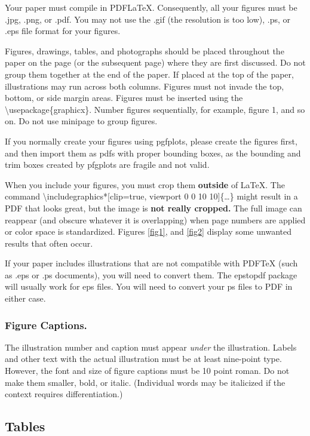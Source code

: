 Your paper must compile in PDF\LaTeX{}. Consequently, all your figures
must be .jpg, .png, or .pdf. You may not use the .gif (the resolution is
too low), .ps, or .eps file format for your figures.

Figures, drawings, tables, and photographs should be placed throughout
the paper on the page (or the subsequent page) where they are first
discussed. Do not group them together at the end of the paper. If placed
at the top of the paper, illustrations may run across both columns.
Figures must not invade the top, bottom, or side margin areas. Figures
must be inserted using the \textbackslash usepackage\{graphicx\}. Number
figures sequentially, for example, figure 1, and so on. Do not use
minipage to group figures.

If you normally create your figures using pgfplots, please create the
figures first, and then import them as pdfs with proper bounding boxes,
as the bounding and trim boxes created by pfgplots are fragile and not
valid.

When you include your figures, you must crop them \textbf{outside} of
\LaTeX{}. The command \textbackslash includegraphics*{[}clip=true,
viewport 0 0 10 10{]}\{\ldots\} might result in a PDF that looks great,
but the image is \textbf{not really cropped.} The full image can
reappear (and obscure whatever it is overlapping) when page numbers are
applied or color space is standardized. Figures \ref{fig1}, and
\ref{fig2} display some unwanted results that often occur.

If your paper includes illustrations that are not compatible with
PDF\TeX{} (such as .eps or .ps documents), you will need to convert
them. The epstopdf package will usually work for eps files. You will
need to convert your ps files to PDF in either case.

\subsubsection {Figure Captions.}

The illustration number and caption must appear \textit{under} the
illustration. Labels and other text with the actual illustration must be
at least nine-point type. However, the font and size of figure captions
must be 10 point roman. Do not make them smaller, bold, or italic.
(Individual words may be italicized if the context requires
differentiation.)

\subsection{Tables}

